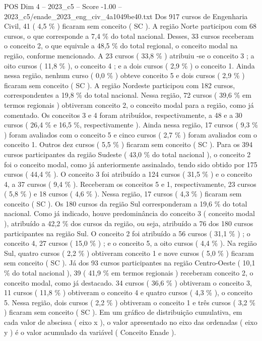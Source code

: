 \begin{textsample}{POS Dim 4 – 2023\_c5 – Score -1.00 – 2023\_c5/enade\_2023\_eng\_civ\_4a1049be40.txt}
Dos 917 cursos de Engenharia Civil, 41 ( 4,5 \% ) ficaram sem conceito ( SC ).
A região Norte participou com 68 cursos, o que corresponde a 7,4 \% do total nacional.
Desses, 33 cursos receberam o conceito 2, o que equivale a 48,5 \% do total regional, o conceito modal na região, conforme mencionado.
A 23 cursos ( 33,8 \% ) atribuiu -se o conceito 3 ; a oito cursos ( 11,8 \% ), o conceito 4 ; e a dois cursos ( 2,9 \% ) o conceito 1.
Ainda nessa região, nenhum curso ( 0,0 \% ) obteve conceito 5 e dois cursos ( 2,9 \% ) ficaram sem conceito ( SC ).
A região Nordeste participou com 182 cursos, correspondentes a 19,8 \% do total nacional.
Nessa região, 72 cursos ( 39,6 \% em termos regionais ) obtiveram conceito 2, o conceito modal para a região, como já comentado.
Os conceitos 3 e 4 foram atribuídos, respectivamente, a 48 e a 30 cursos ( 26,4 \% e 16,5 \%, respectivamente ).
Ainda nessa região, 17 cursos ( 9,3 \% ) foram avaliados com o conceito 5 e cinco cursos ( 2,7 \% ) foram avaliados com o conceito 1.
Outros dez cursos ( 5,5 \% ) ficaram sem conceito ( SC ).
Para os 394 cursos participantes da região Sudeste ( 43,0 \% do total nacional ), o conceito 2 foi o conceito modal, como já anteriormente assinalado, tendo sido obtido por 175 cursos ( 44,4 \% ).
O conceito 3 foi atribuído a 124 cursos ( 31,5 \% ) e o conceito 4, a 37 cursos ( 9,4 \% ).
Receberam os conceitos 5 e 1, respectivamente, 23 cursos ( 5,8 \% ) e 18 cursos ( 4,6 \% ).
Nessa região, 17 cursos ( 4,3 \% ) ficaram sem conceito ( SC ).
Os 180 cursos da região Sul corresponderam a 19,6 \% do total nacional.
Como já indicado, houve predominância do conceito 3 ( conceito modal ), atribuído a 42,2 \% dos cursos da região, ou seja, atribuído a 76 dos 180 cursos participantes na região Sul.
O conceito 2 foi atribuído a 56 cursos ( 31,1 \% ) ; o conceito 4, 27 cursos ( 15,0 \% ) ; e o conceito 5, a oito cursos ( 4,4 \% ).
Na região Sul, quatro cursos ( 2,2 \% ) obtiveram conceito 1 e nove cursos ( 5,0 \% ) ficaram sem conceito ( SC ).
Já dos 93 cursos participantes na região Centro-Oeste ( 10,1 \% do total nacional ), 39 ( 41,9 \% em termos regionais ) receberam conceito 2, o conceito modal, como já destacado. 34 cursos ( 36,6 \% ) obtiveram o conceito 3, 11 cursos ( 11,8 \% ) obtiveram o conceito 4 e quatro cursos ( 4,3 \% ), o conceito 5.
Nessa região, dois cursos ( 2,2 \% ) obtiveram o conceito 1 e três cursos ( 3,2 \% ) ficaram sem conceito ( SC ).
Em um gráfico de distribuição cumulativa, em cada valor de abscissa ( eixo x ), o valor apresentado no eixo das ordenadas ( eixo y ) é o valor acumulado da variável ( Conceito Enade ).

\end{textsample}
